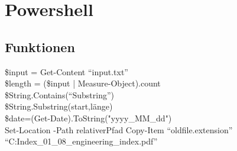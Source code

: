 \chapter{Powershell}\label{chap:Powershell}
\section{Funktionen}
\$input = Get-Content \enquote{input.txt}\\
\$length = (\$input | Measure-Object).count\\
\$String.Contains(\enquote{Substring})\\
\$String.Substring(start,länge)\\
\$date=(Get-Date).ToString("yyyy\_MM\_dd")\\
Set-Location -Path relativerPfad
Copy-Item \enquote{oldfile.extension} \enquote{C:\Users\Maurice\Documents\Engineering Index_01_08_engineering_index.pdf}\\
